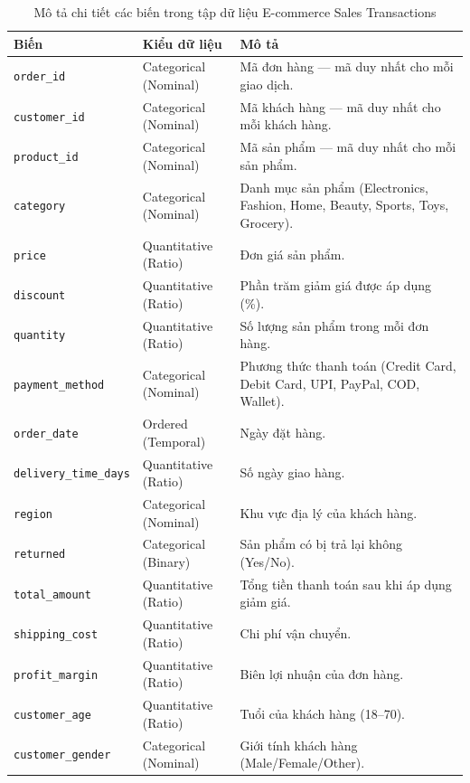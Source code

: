 \documentclass[12pt,a4paper]{article}
\begin{document}
\begin{table}[h!]
\centering
\renewcommand{\arraystretch}{1.3}
\begin{tabularx}{\textwidth}{|l|L{3.5cm}|X|}
    \hline
    \textbf{Biến} & \textbf{Kiểu dữ liệu} & \textbf{Mô tả} \\
    \hline
    \texttt{order\_id} & Categorical (Nominal) & Mã đơn hàng --- mã duy nhất cho mỗi giao dịch. \\
    \hline
    \texttt{customer\_id} & Categorical (Nominal) & Mã khách hàng --- mã duy nhất cho mỗi khách hàng. \\
    \hline
    \texttt{product\_id} & Categorical (Nominal) & Mã sản phẩm --- mã duy nhất cho mỗi sản phẩm. \\
    \hline
    \texttt{category} & Categorical (Nominal) & Danh mục sản phẩm (Electronics, Fashion, Home, Beauty, Sports, Toys, Grocery). \\
    \hline
    \texttt{price} & Quantitative (Ratio) & Đơn giá sản phẩm. \\
    \hline
    \texttt{discount} & Quantitative (Ratio) & Phần trăm giảm giá được áp dụng (\%). \\
    \hline
    \texttt{quantity} & Quantitative (Ratio) & Số lượng sản phẩm trong mỗi đơn hàng. \\
    \hline
    \texttt{payment\_method} & Categorical (Nominal) & Phương thức thanh toán (Credit Card, Debit Card, UPI, PayPal, COD, Wallet). \\
    \hline
    \texttt{order\_date} & Ordered (Temporal) & Ngày đặt hàng. \\
    \hline
    \texttt{delivery\_time\_days} & Quantitative (Ratio) & Số ngày giao hàng. \\
    \hline
    \texttt{region} & Categorical (Nominal) & Khu vực địa lý của khách hàng. \\
    \hline
    \texttt{returned} & Categorical (Binary) & Sản phẩm có bị trả lại không (Yes/No). \\
    \hline
    \texttt{total\_amount} & Quantitative (Ratio) & Tổng tiền thanh toán sau khi áp dụng giảm giá. \\
    \hline
    \texttt{shipping\_cost} & Quantitative (Ratio) & Chi phí vận chuyển. \\
    \hline
    \texttt{profit\_margin} & Quantitative (Ratio) & Biên lợi nhuận của đơn hàng. \\
    \hline
    \texttt{customer\_age} & Quantitative (Ratio) & Tuổi của khách hàng (18--70). \\
    \hline
    \texttt{customer\_gender} & Categorical (Nominal) & Giới tính khách hàng (Male/Female/Other). \\
    \hline
\end{tabularx}
\caption{Mô tả chi tiết các biến trong tập dữ liệu E-commerce Sales Transactions}
\end{table}
\end{document}
